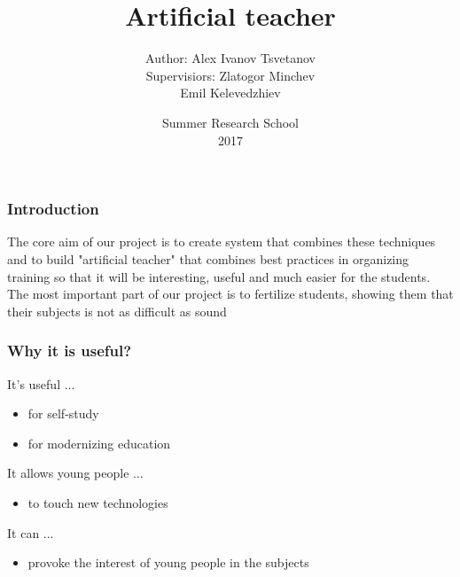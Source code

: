 \documentclass[12pt]{beamer}
\begin{document}
	
	\date[SRS'17]{Summer Research School \\ 2017}
	\author[Mr. Zlatogor Minchev, Alex]{
		\begin{table}[]
			\begin{tabular}{rl}
				\normalsize{Author:    } & \normalsize{Alex Ivanov Tsvetanov} \\
				\scriptsize{Supervisiors:     } & \scriptsize{Zlatogor Minchev} \\
				& \scriptsize{Emil Kelevedzhiev} \\
			\end{tabular}
		\end{table}
	}
	\title[ArtTeach]{Artificial teacher}
	
	\begin{frame}
		\titlepage
	\end{frame}

	\begin{frame}
		\frametitle{Introduction}
		\begin{block}{}
			The core aim of our project is to create system that combines these techniques and to build "artificial teacher" that combines best practices in organizing training so that it will be interesting, useful and much easier for the students. The most important part of our project is to fertilize students, showing them that their subjects is not as difficult as sound
		\end{block}
	\end{frame}
	
	\begin{frame}
		\frametitle{Why it is useful?}
		\begin{block}{It's useful ...}
			\begin{itemize}
				\item for self-study
				\item for modernizing education
			\end{itemize}
		\end{block}
		\begin{block}{It allows young people ...}
			\begin{itemize}
				\item to touch new technologies
			\end{itemize}
		\end{block}
		\begin{block}{It can ...}
			\begin{itemize}
				\item provoke the interest of young people in the subjects
			\end{itemize}
		\end{block}
	\end{frame}
	
\end{document}
